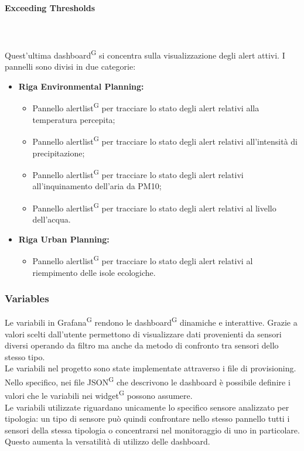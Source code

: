 \documentclass[8pt]{article}
\newcommand{\glossterm}[1]{#1\textsuperscript{G}} %
\newcommand{\subsubsubsection}[1]{\paragraph{#1}\mbox{}\\\\}
\begin{document}
\subsubsubsection{Exceeding Thresholds}
Quest'ultima \glossterm{dashboard} si concentra sulla visualizzazione degli alert attivi. I pannelli sono divisi in due categorie:
\begin{itemize}
    \item \textbf{Riga Environmental Planning:}
    \begin{itemize}
        \item Pannello \glossterm{alertlist} per tracciare lo stato degli alert relativi alla temperatura percepita;
        \item Pannello \glossterm{alertlist} per tracciare lo stato degli alert relativi all'intensità di precipitazione;
        \item Pannello \glossterm{alertlist} per tracciare lo stato degli alert relativi all'inquinamento dell'aria da PM10;
        \item Pannello \glossterm{alertlist} per tracciare lo stato degli alert relativi al livello dell'acqua.
    \end{itemize}
    \item \textbf{Riga Urban Planning:}
    \begin{itemize}
        \item Pannello \glossterm{alertlist} per tracciare lo stato degli alert relativi al riempimento delle isole ecologiche.
    \end{itemize}
\end{itemize}
\subsubsection{Variables}
Le variabili in \glossterm{Grafana} rendono le \glossterm{dashboard} dinamiche e
interattive. Grazie a valori scelti dall'utente permettono di visualizzare dati provenienti da sensori diversi operando da filtro ma anche da metodo di confronto tra sensori dello stesso tipo.
\\Le variabili nel progetto sono state implementate attraverso i file di provisioning. Nello specifico, nei file \glossterm{JSON} che descrivono le dashboard è possibile definire i valori che le variabili nei \glossterm{widget} possono assumere.
\\Le variabili utilizzate riguardano unicamente lo specifico sensore analizzato per tipologia: un tipo di sensore può quindi confrontare nello stesso pannello tutti i sensori della stessa tipologia o concentrarsi nel monitoraggio di uno in particolare. Questo aumenta la versatilità di utilizzo delle dashboard.
\end{document}
